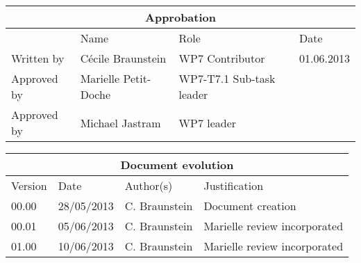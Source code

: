 \documentclass{openetcs_report}
\begin{document}
\begin{tabular}{|p{2.2cm}|p{4cm}|p{4cm}|p{2cm}|}
\hline
\multicolumn{4}{|c|}{Approbation} \\
\hline
  &  Name & Role & Date   \\
\hline  
Written by    &  C\'ecile Braunstein & WP7 Contributor  & 01.06.2013 \\
\hline
Approved by & Marielle Petit-Doche & WP7-T7.1 Sub-task  leader & \\
\hline
Approved by & Michael Jastram & WP7 leader & \\
\hline
\end{tabular}

\begin{tabular}{|p{2.2cm}|p{2cm}|p{3cm}|p{5cm}|}
\hline
\multicolumn{4}{|c|}{Document evolution} \\
\hline
Version &  Date & Author(s) & Justification  \\
\hline  
00.00 & 28/05/2013 & C. Braunstein &  Document creation  \\
00.01 & 05/06/2013 & C. Braunstein &  Marielle review incorporated  \\
01.00 & 10/06/2013 & C. Braunstein &  Marielle review incorporated  \\
\hline  

\end{tabular}



\newcommand{\tbd}{\colorbox{cyan}{\%\%To Be Defined\%\%}}
\newcommand{\tbc}{\colorbox{cyan}{\%\%To Be Confirmed\%\%}}

\newlength{\origindent}



\newenvironment{author_comment}{
        \begin{quote}
        \begin{itshape}\textcolor{green}{Author.}
}{
        \end{itshape}
        \end{quote}
}


\newenvironment{assessor1}{
        \begin{quote}
        \begin{itshape} \textcolor{blue}{Assessor 1.}
}{
        \end{itshape}
        \end{quote}
}
\end{document}

